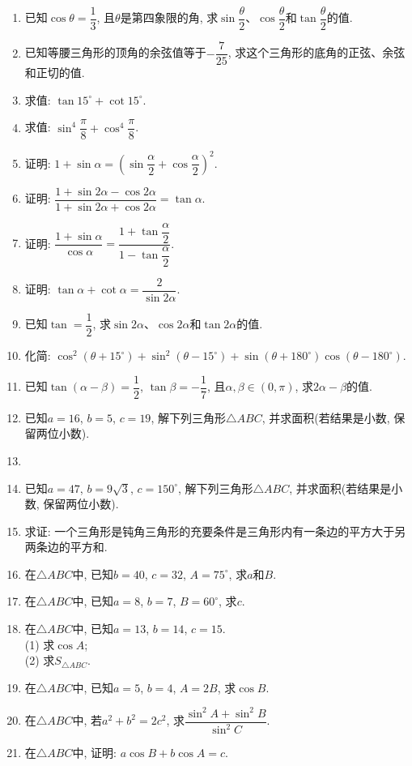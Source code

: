 \documentclass[10pt,a4paper]{article}
\begin{document}
\begin{enumerate}[1.]
\item 已知$\cos \theta =\dfrac 13$, 且$\theta$是第四象限的角, 求$\sin \dfrac{\theta}2$、$\cos \dfrac{\theta}2$和$\tan \dfrac{\theta}2$的值.
\item 已知等腰三角形的顶角的余弦值等于$-\dfrac 7{25}$, 求这个三角形的底角的正弦、余弦和正切的值.
\item 求值: $\tan 15^\circ+\cot 15^\circ$.
\item 求值: $\sin ^4\dfrac{\pi}8+\cos ^4\dfrac{\pi}8$.
\item 证明: $1+\sin \alpha =(\sin \dfrac{\alpha}2+\cos \dfrac{\alpha}2)^2$.
\item 证明: $\dfrac{1+\sin 2\alpha -\cos 2\alpha}{1+\sin 2\alpha +\cos 2\alpha}=\tan \alpha$.
\item 证明: $\dfrac{1+\sin \alpha}{\cos \alpha}=\dfrac{1+\tan \dfrac{\alpha}2}{1-\tan \dfrac{\alpha}2}$.
\item 证明: $\tan \alpha +\cot \alpha =\dfrac 2{\sin 2\alpha}$.
\item 已知$\tan =\dfrac 12$, 求$\sin 2\alpha$、$\cos 2\alpha$和$\tan 2\alpha$的值.
\item 化简: $\cos ^2(\theta +15^\circ)+\sin ^2(\theta -15^\circ)+\sin (\theta +180^\circ)\cos (\theta -180^\circ)$.
\item 已知$\tan (\alpha -\beta)=\dfrac 12$, $\tan \beta =-\dfrac 17$, 且$\alpha,\beta \in (0,\pi)$, 求$2\alpha -\beta$的值.
\item 已知$a=16$, $b=5$, $c=19$, 解下列三角形$\triangle ABC$, 并求面积(若结果是小数, 保留两位小数).
\item \item 已知$a=47$, $b=9\sqrt 3$, $c=150^\circ$, 解下列三角形$\triangle ABC$, 并求面积(若结果是小数, 保留两位小数).
\item 求证: 一个三角形是钝角三角形的充要条件是三角形内有一条边的平方大于另两条边的平方和.
\item 在$\triangle ABC$中, 已知$b=40$, $c=32$, $A=75^\circ$, 求$a$和$B$.
\item 在$\triangle ABC$中, 已知$a=8$, $b=7$, $B=60^\circ$, 求$c$.
\item 在$\triangle ABC$中, 已知$a=13$, $b=14$, $c=15$.\\
(1) 求$\cos A$;\\
(2) 求$S_{\triangle ABC}$.
\item 在$\triangle ABC$中, 已知$a=5$, $b=4$, $A=2B$, 求$\cos B$.
\item 在$\triangle ABC$中, 若$a^2+b^2=2c^2$, 求$\dfrac{\sin ^2A+\sin ^2B}{\sin ^2C}$.
\item 在$\triangle ABC$中, 证明: $a\cos B+b\cos A=c$.

\end{enumerate}
\end{document}
